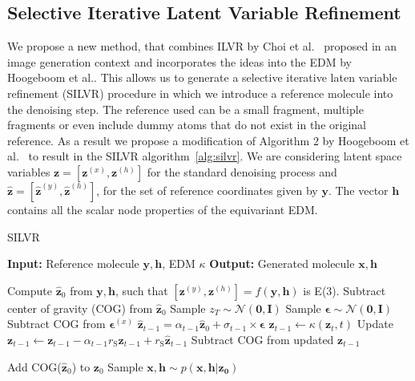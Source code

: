 \documentclass[journal=jacsat,manuscript=article]{achemso}
\begin{document}
\subsection{Selective Iterative Latent Variable Refinement}
\label{sec:silvr}
We propose a new method, that combines ILVR by Choi et al.~\cite{choi2021ilvr} proposed in an image generation context and incorporates the ideas into the EDM by Hoogeboom et al.. This allows us to generate a selective iterative laten variable refinement (SILVR) procedure in which we introduce a reference molecule into the denoising step. The reference used can be a small fragment, multiple fragments or even include dummy atoms that do not exist in the original reference. As a result we propose a modification of Algorithm 2 by Hoogeboom et al.~\cite{hoogeboom2022equivariant} to result in the SILVR algorithm~\ref{alg:silvr}.  We are considering latent space variables $\mathbf{z}=[\mathbf{z}^{(x)},\mathbf{z}^{(h)}]$ for the standard denoising process and  $\mathbf{\hat{z}} = [\mathbf{\hat{z}}^{(y)},\mathbf{\hat{z}}^{(h)}]$, for the set of reference coordinates given by $\mathbf{y}$. The vector $\mathbf{h}$ contains all the scalar node properties of the equivariant EDM. 
\begin{algorithm}
\caption{SILVR}\label{alg:silvr}
\begin{algorithmic}[1]
\State \textbf{Input:} Reference molecule $\mathbf{y,h}$, EDM $\kappa$ 
\State \textbf{Output:} Generated molecule $\mathbf{x,h}$

\State Compute $\mathbf{\hat{z}}_0$ from $\mathbf{y, h}$, such that $[\mathbf{z}^{(y)} , \mathbf{z}^{(h)} ] = f (\mathbf{y, h})$ is E(3). 
\State Subtract center of gravity (COG) from $\mathbf{\hat{z}}_0$
\State Sample $z_T \sim \mathcal{N}(\mathbf{0,I})$
    \State Sample $\boldsymbol{\epsilon} \sim \mathcal{N}(\mathbf{0,I})$
    \State Subtract COG from $\boldsymbol{\epsilon}^{(x)}$
    \State $\mathbf{\hat{z}}_{t-1} = \alpha_{t-1} \mathbf{\hat{z}}_{0} +\sigma_{t-1}\times\boldsymbol{\epsilon}$
    \State $\mathbf{z}_{t-1} \gets \kappa (\mathbf{z}_t,t)$
    \State Update $\mathbf{z}_{t-1} \gets \mathbf{z}_{t-1} - \alpha_{t-1}r_{\mathrm{S}} \mathbf{z}_{t-1} +r_{\mathrm{S}} \mathbf{\hat{z}}_{t-1}$ 
    \State Subtract COG from updated $\mathbf{z}_{t-1}$

\EndFor
\State Add COG($\mathbf{\hat{z}}_0$) to $\mathbf{z}_0$
\State Sample $\mathbf{x,h} \sim p(\mathbf{x,h|z_0})$ 
\end{algorithmic}
\end{algorithm}
\end{document}
